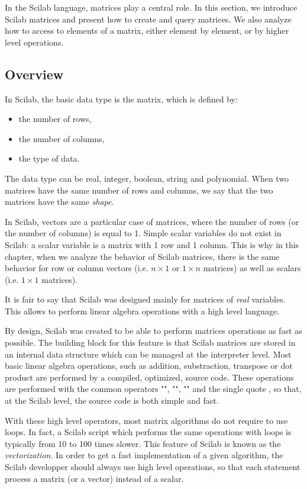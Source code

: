 In the Scilab language, matrices play 
a central role. In this section, we introduce Scilab 
matrices and present how to create and query matrices. We also analyze 
how to access to elements of a matrix, either element by element,
or by higher level operations.

\subsection{Overview}

In Scilab, the basic data type is the matrix, which is defined by:
\begin{itemize}
\item the number of rows,
\item the number of columns,
\item the type of data.
\end{itemize}
The data type can be real, integer, boolean, string and polynomial.
When two matrices have the same number of rows and columns,
we say that the two matrices have the same \emph{shape}.

In Scilab, vectors are a particular case of matrices,
where the number of rows (or the number of columns) is equal to 1.
Simple scalar variables do not exist in Scilab:
a scalar variable is a matrix with 1 row and 1 column.
This is why in this chapter, when we analyze the behavior of Scilab 
matrices, there is the same behavior for row or column vectors 
(i.e. $n\times 1$ or $1\times n$ matrices) as well as scalars 
(i.e. $1\times 1$ matrices).

It is fair to say that Scilab was designed mainly for matrices of 
\emph{real} variables. This allows to perform linear algebra operations with 
a high level language. 

By design, Scilab was created to be able to perform
matrices operations as fast as possible. The building block for this feature 
is that Scilab matrices are stored in an internal data structure 
which can be managed at the interpreter level.
Most basic linear algebra operations, such as addition, substraction,
transpose or dot product are performed by a compiled, optimized, source code.
These operations are performed with the common operators "\scivar{+}", "\scivar{-}", "\scivar{*}" and the single 
quote \scisinglequote{}, so that, at the Scilab level, the source code is both simple and fast.

With these high level operators, most matrix algorithms do not require to 
use loops. In fact, a Scilab script which performs the same operations
with loops is typically from 10 to 100 times slower.
This feature of Scilab is known as the \emph{vectorization}.
In order to get a fast implementation of a given algorithm, the Scilab 
developper should always use high level operations, so that each statement
process a matrix (or a vector) instead of a scalar.


